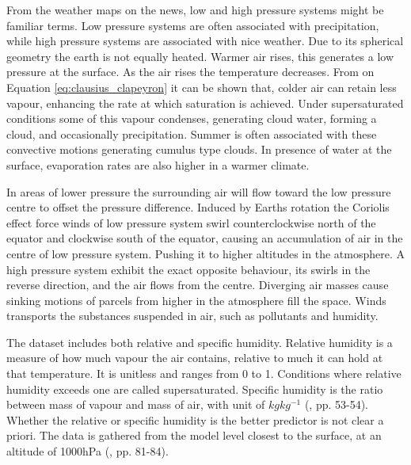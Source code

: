 From the weather maps on the news, low and high pressure systems might be familiar terms. Low pressure systems are often associated with precipitation, while high pressure systems are associated with nice weather. Due to its spherical geometry the earth is not equally heated. Warmer air rises, this generates a low pressure at the surface. As the air rises the temperature decreases. From on Equation \eqref{eq:clausius_clapeyron} it can be shown that, colder air can retain less vapour, enhancing the rate at which saturation is achieved. Under supersaturated conditions some of this vapour condenses, generating cloud water, forming a cloud, and occasionally precipitation. Summer is often associated with these convective motions generating cumulus type clouds. In presence of water at the surface, evaporation rates are also higher in a warmer climate. 

In areas of lower pressure the surrounding air will flow toward the low pressure centre to offset the pressure difference. Induced by Earths rotation the Coriolis effect force winds of low pressure system swirl counterclockwise north of the equator and clockwise south of the equator, causing an accumulation of air in the centre of low pressure system. Pushing it to higher altitudes in the atmosphere. A high pressure system exhibit the exact opposite behaviour, its swirls in the reverse direction, and the air flows from the centre. Diverging air masses cause sinking motions of parcels from higher in the atmosphere fill the space.
Winds transports the substances suspended in air, such as pollutants and humidity.

The dataset includes both relative and specific humidity. Relative humidity is a measure of how much vapour the air contains, relative to much it can hold at that temperature. It is unitless and ranges from 0 to 1. Conditions where relative humidity exceeds one are called supersaturated. Specific humidity is the ratio between mass of vapour and mass of air, with unit of $kg kg^{-1}$ (\cite{lohmann2016}, pp. 53-54). Whether the relative or specific humidity is the better predictor is not clear a priori. The data is gathered from the model level closest to the surface, at an altitude of 1000hPa (\cite{lohmann2016}, pp. 81-84). 

